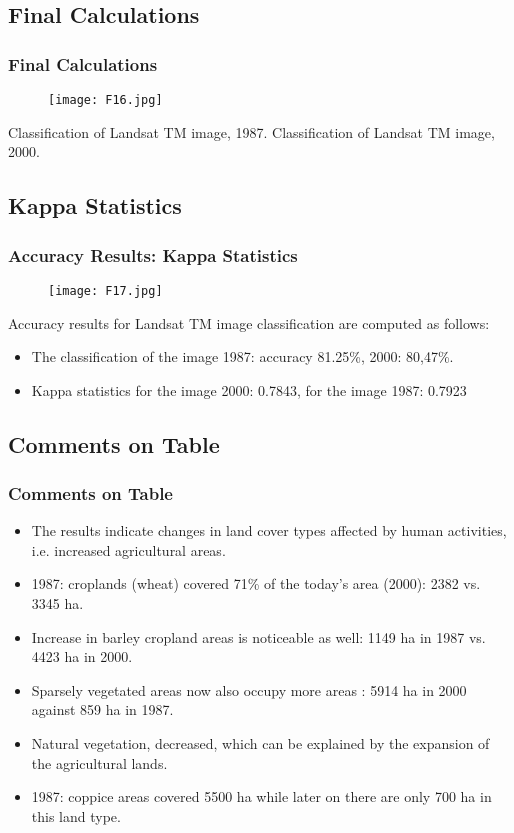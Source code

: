 \documentclass[pdflatex,compress,8pt,
	xcolor={dvipsnames,dvipsnames,svgnames,x11names,table},
	hyperref={
	breaklinks = true, 
	pdfauthor={Lemenkova Polina}, 
	pdfsubject={Preentation}, 
	pdfcreator={Lemenkova Polina}, 
	pdfproducer={Lemenkova Polina}, 
	citecolor=NavyBlue, 
	urlbordercolor=cyan,
	urlcolor = NavyBlue, 
	breaklinks = true}]{beamer}
\begin{document}
\subsection{Final Calculations}
\begin{frame}\frametitle{Final Calculations}
\begin{figure}[H]
	\centering
		\texttt{[image: F16.jpg]}
\end{figure}
Classification of Landsat TM image, 1987. 
Classification of Landsat TM image, 2000.
\end{frame}

\subsection{Kappa Statistics}
\begin{frame}\frametitle{Accuracy Results: Kappa Statistics}
\begin{figure}[H]
	\centering
		\texttt{[image: F17.jpg]}
\end{figure}
Accuracy results for Landsat TM image classification are computed as follows:
\begin{itemize}
	\item The classification of the image 1987: accuracy 81.25\%, 2000: 80,47\%.
	\item Kappa statistics for the  image 2000: 0.7843, for the image 1987: 0.7923
\end{itemize}
\end{frame}

\subsection{Comments on Table}
\begin{frame}\frametitle{Comments on Table}
\begin{itemize}
	\item The results indicate changes in land cover types affected by human activities, i.e. increased agricultural areas.
	\item 1987: croplands (wheat) covered 71\% of the today's area (2000): 2382 vs. 3345 ha.
	\item Increase in barley cropland areas is noticeable as well: 1149 ha in 1987 vs. 4423 ha in 2000.
	\item Sparsely vegetated areas now also occupy more areas : 5914 ha in 2000 against 859 ha in 1987.
	\item Natural vegetation, decreased, which can be explained by the expansion of the agricultural lands.
	\item 1987: coppice areas covered 5500 ha while later on there are only 700 ha in this land type.
\end{itemize}
\end{frame}
\end{document}
